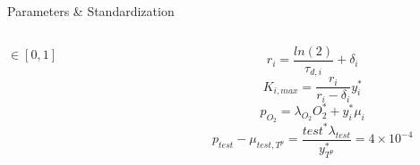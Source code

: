 \documentclass[aspectratio=169,9pt]{beamer}
\begin{document}
\begin{frame}{Parameters \& Standardization}
\begin{columns}
\begin{column}{0.5\textwidth}
\begin{itemize}
        $\in [0,1]$
      \end{itemize}
    \end{column}
    \begin{column}{0.5\textwidth}
      \begin{equation}
        r_i = \frac{ln(2)}{\tau_{d,i}} + \delta_i
        \label{r_eq}
      \end{equation}
      \begin{equation}
        K_{i,max}=\frac{r_i}{r_i-\delta_i} y_i^*
        \label{rho_eq}
      \end{equation}
      \begin{equation}
        p_{O_2} = \lambda_{O_2} O_2^* + y_i^* \mu_i
        \label{p_o2_eq}
      \end{equation}
      \begin{equation}
        p_{test} - \mu_{test,T^p} = \frac{test^* \lambda_{test}}{y_{T^p}^*} = 4 \times 10^{-4}
        \label{p_test_eq}
      \end{equation}
    \end{column}
  \end{columns}
\end{frame}
\end{document}

